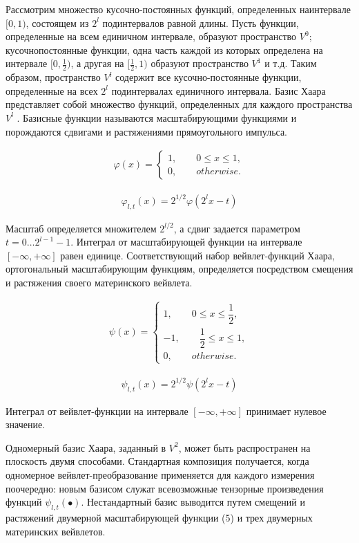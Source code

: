 \documentclass[a4paper, 14pt]{extarticle}	%
\begin{document}
Рассмотрим множество кусочно-постоянных функций, определенных наинтервале $[0, 1)$, состоящем из $2^l$ подинтервалов равной длины. Пусть функции, определенные на всем единичном интервале, образуют пространство $V^0$; кусочнопостоянные функции, одна часть каждой из которых определена на интервале $[0, \frac{1}{2})$, а другая на $[\frac{1}{2}, 1)$ образуют пространство $V^1$ и т.д. Таким образом, пространство $V^l$ содержит все кусочно-постоянные функции, определенные на всех $2^l$ подинтервалах единичного интервала. Базис Хаара представляет собой множество функций, определенных для каждого пространства $V^l$ . Базисные функции называются масштабирующими функциями и порождаются сдвигами и растяжениями прямоугольного импульса.

\begin{gather}
\varphi(x) =
  \begin{cases}
    1,\qquad 0\le x \le 1,\\
    0,\qquad otherwise.
 \end{cases}
\end{gather}

\begin{gather}
\varphi_{l,t}(x) = 2^{1/2}\varphi(2^lx-t)
\end{gather} 

Масштаб определяется множителем $2^{l/2}$, а сдвиг задается параметром $t = 0 \ldots{} 2^{l-1} - 1$. Интеграл от масштабирующей функции на интервале $[-\infty, +\infty]$ равен единице. Соответствующий набор вейвлет-функций Хаара, ортогональный масштабирующим функциям, определяется посредством смещения и растяжения своего материнского вейвлета.

\begin{gather}
\psi(x) =
  \begin{cases}
    1,\qquad 0\le x \le \dfrac{1}{2},\\
    -1,\qquad \dfrac{1}{2}\le x \le 1,\\
    0,\qquad otherwise.
 \end{cases}
\end{gather}

\begin{gather}
\psi_{l,t}(x) = 2^{1/2}\psi(2^lx-t)
\end{gather} 

Интеграл от вейвлет-функции на интервале $[-\infty, +\infty]$ принимает нулевое значение.

Одномерный базис Хаара, заданный в $V^2$, может быть распространен на плоскость двумя способами. Стандартная композиция получается, когда одномерное вейвлет-преобразование применяется для каждого измерения поочередно: новым базисом служат всевозможные тензорные произведения функций $\psi_{l,t}(\bullet)$. Нестандартный базис выводится путем смещений и растяжений двумерной масштабирующей функции (5) и трех двумерных материнских вейвлетов.
\end{document}
